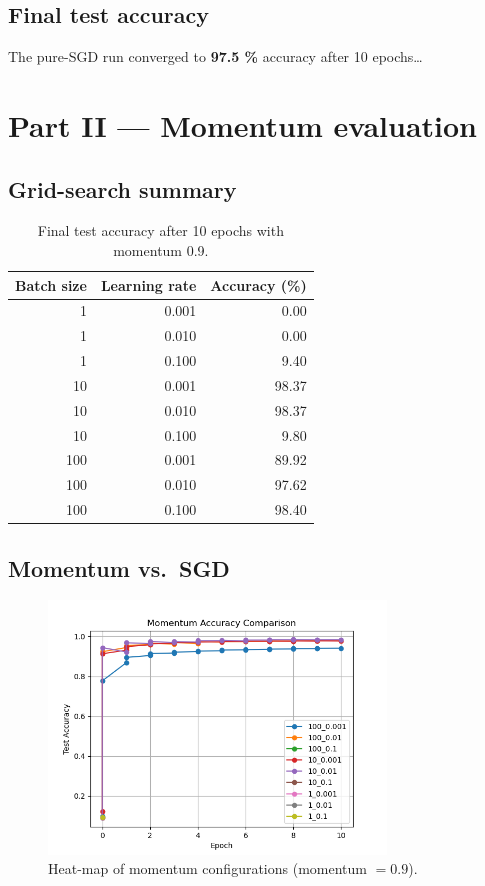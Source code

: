 \documentclass[11pt]{article}
\begin{document}
\subsection{Final test accuracy}
The pure-SGD run converged to \textbf{97.5 \%} accuracy after 10 epochs…\footnotemark[1]

\section{Part II — Momentum evaluation}

\subsection{Grid-search summary}
\begin{table}[H]
  \centering
  \caption{Final test accuracy after 10 epochs with momentum 0.9.}
  \label{tab:momgrid}
  \begin{tabular}{rrr}
    \toprule
    \textbf{Batch size} & \textbf{Learning rate} & \textbf{Accuracy (\%)}\\
    \midrule
      1  & 0.001 &  0.00\\
      1  & 0.010 &  0.00\\
      1  & 0.100 &  9.40\\
     10  & 0.001 & 98.37\\
     10  & 0.010 & 98.37\\
     10  & 0.100 &  9.80\\
    100  & 0.001 & 89.92\\
    100  & 0.010 & 97.62\\
    100  & 0.100 & 98.40\\
    \bottomrule
  \end{tabular}
\end{table}

\subsection{Momentum vs.\ SGD}
\begin{figure}[H]
  \centering
  \includegraphics[width=0.8\textwidth]{figures/compare_partII.png}
  \caption{Heat-map of momentum configurations (momentum $=0.9$).}
\end{figure}
\end{document}
